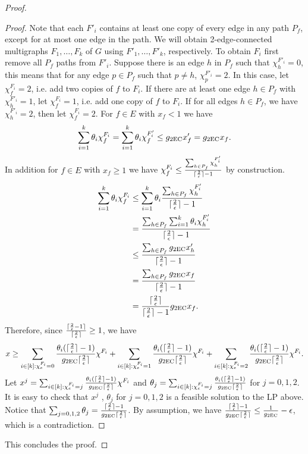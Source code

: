 \begin{proof}
\begin{proof}
		Note that each $F'_i$ contains at least one copy of every edge in any path $P_f$, except for at most one edge in the path. We will obtain 2-edge-connected multigraphs $F_1,\ldots,F_k$ of $G$ using $F'_1,\ldots,F'_k$, respectively. To obtain $F_i$ first remove all $P_f$ paths from $F'_i$. Suppose there is an edge $h$ in $P_f$ such that $\chi^{F'_i}_h=0$, this means that for any edge $p\in P_f$ such that $p\neq h$, $\chi^{F'_i}_p=2$. In this case, let $\chi^{F_i}_f=2$, i.e. add two copies of $f$ to $F_i$. If there are at least one edge $h\in P_f$ with $\chi^{F'_i}_h= 1$, let $\chi^{F_i}_f=1$, i.e. add one copy of $f$ to $F_i$. If for all edges $h\in P_f$, we have $\chi^{F'_i}_h=2$, then let $\chi^{F_i}_f=2$. For $f\in E$ with $x_f<1$ we have
		\begin{equation}
		\sum_{i=1}^{k}\theta_i \chi^{F_i}_f=\sum_{i=1}^{k}\theta_i \chi^{F'_i}_f\leq g_{\operatorname{2EC}}x'_f= g_{\operatorname{2EC}}x_f.
		\end{equation}
		In addition for $f\in E$ with $x_f\geq 1$ we have $\chi^{F_i}_f \leq \frac{\sum_{h\in P_f}\chi^{F'_i}_h}{\lceil\frac{2}{\epsilon}\rceil-1}$ by construction.
		\begin{align*}
			\sum_{i=1}^{k}\theta_i \chi^{F_i}_f&\leq \sum_{i=1}^{k}\theta_i\frac{\sum_{h\in P_f}\chi^{F'_i}_h}{\lceil\frac{2}{\epsilon}\rceil-1}\\
			&= \frac{\sum_{h\in P_f} \sum_{i=1}^{k}\theta_i\chi^{F'_i}_h}{\lceil\frac{2}{\epsilon}\rceil-1}\\
			&\leq \frac{\sum_{h\in P_f} g_{\operatorname{2EC}}x'_h}{\lceil\frac{2}{\epsilon}\rceil-1}\\
			&= \frac{\sum_{h\in P_f} g_{\operatorname{2EC}}x_f}{\lceil\frac{2}{\epsilon}\rceil-1}\\
			&= \frac{\lceil\frac{2}{\epsilon}\rceil}{\lceil\frac{2}{\epsilon}\rceil-1}g_{\operatorname{2EC}}x_f.
		\end{align*}
		Therefore, since $\frac{\lceil\frac{2}{\epsilon}-1\rceil}{\lceil\frac{2}{\epsilon}\rceil}\geq 1$, we have 
		\begin{equation}
		x \geq\sum_{i\in [k]: \chi^{F_i}_e=0}\frac{\theta_i(\lceil\frac{2}{\epsilon}\rceil-1)}{g_{\operatorname{2EC}}\lceil\frac{2}{\epsilon}\rceil}\chi^{F_i}+ \sum_{i\in [k]: \chi^{F_i}_e=1}\frac{\theta_i(\lceil\frac{2}{\epsilon}\rceil-1)}{g_{\operatorname{2EC}}\lceil\frac{2}{\epsilon}\rceil}\chi^{F_i}+\sum_{i\in [k]: \chi^{F_i}_e=2}\frac{\theta_i(\lceil\frac{2}{\epsilon}\rceil-1)}{g_{\operatorname{2EC}}\lceil\frac{2}{\epsilon}\rceil}\chi^{F_i}.
		\end{equation}
		Let $x^j = \sum_{i\in [k]: \chi^{F_i}_e=j}\frac{\theta_i(\lceil\frac{2}{\epsilon}\rceil-1)}{g_{\operatorname{2EC}}\lceil\frac{2}{\epsilon}\rceil}\chi^{F_i}$ and $\theta_j =  \sum_{i\in [k]: \chi^{F_i}_e=j}\frac{\theta_i(\lceil\frac{2}{\epsilon}\rceil-1)}{g_{\operatorname{2EC}}\lceil\frac{2}{\epsilon}\rceil}$ for $j=0,1,2$. It is easy to check that $x^j$ , $\theta_j$ for $j=0,1,2$ is a feasible solution to the LP above. Notice that $\sum_{j=0,1,2}\theta_j = \frac{\lceil\frac{2}{\epsilon}\rceil-1}{g_{\operatorname{2EC}}\lceil\frac{2}{\epsilon}\rceil}$. By assumption, we have $\frac{\lceil\frac{2}{\epsilon}\rceil-1}{g_{\operatorname{2EC}}\lceil\frac{2}{\epsilon}\rceil}\leq  \frac{1}{g_{\operatorname{2EC}}}-\epsilon$, which is a contradiction.
	\end{proof}
	This concludes the proof. \end{proof}
